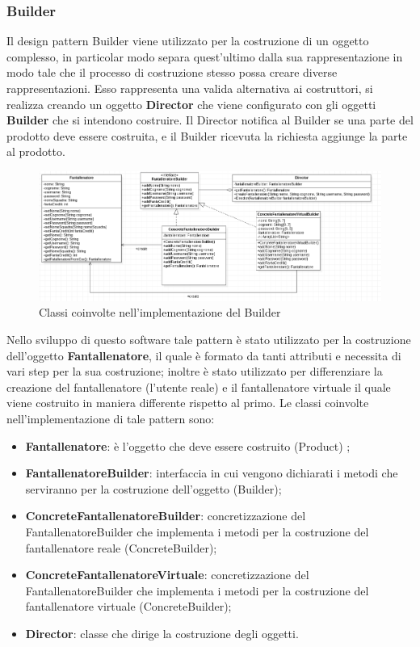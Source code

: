 \documentclass[12pt,a4paper]{article}
\begin{document}
\subsubsection{Builder}
Il design pattern Builder viene utilizzato  per la costruzione di un oggetto complesso,  in particolar modo separa quest'ultimo dalla sua rappresentazione in modo tale che il processo di costruzione stesso possa creare diverse rappresentazioni. Esso rappresenta una valida alternativa ai costruttori, si realizza creando un oggetto \textbf{Director}  che viene configurato con gli oggetti 	\textbf{Builder} che si intendono costruire. Il Director notifica al Builder se una parte del prodotto deve essere costruita, e il Builder ricevuta la richiesta aggiunge la parte al prodotto. \\
\begin{figure}[h]
\centering
\includegraphics[width=15 cm,keepaspectratio]{Builder.png}
\caption{Classi coinvolte nell'implementazione del Builder}
\end{figure}
\newline
Nello sviluppo di questo software tale pattern è stato utilizzato per la costruzione dell'oggetto \textbf{Fantallenatore}, il quale è formato da tanti attributi e necessita di vari step per la sua costruzione; inoltre è stato utilizzato per differenziare la creazione del fantallenatore (l'utente reale) e il fantallenatore virtuale il quale viene costruito in maniera differente rispetto al primo. Le classi coinvolte nell'implementazione di tale pattern sono:
\begin{itemize}
\item \textbf{Fantallenatore}: è l'oggetto che deve essere costruito (Product) ;
\item \textbf{FantallenatoreBuilder}: interfaccia in cui vengono dichiarati  i metodi che serviranno per la costruzione dell'oggetto (Builder);
\item \textbf{ConcreteFantallenatoreBuilder}: concretizzazione del FantallenatoreBuilder che implementa i metodi per la costruzione del fantallenatore reale (ConcreteBuilder);
\item \textbf{ConcreteFantallenatoreVirtuale}: concretizzazione del FantallenatoreBuilder che implementa i metodi per la costruzione del fantallenatore virtuale (ConcreteBuilder);
\item \textbf{Director}: classe che dirige la costruzione degli oggetti.
\end{itemize}
\newpage
\end{document}
